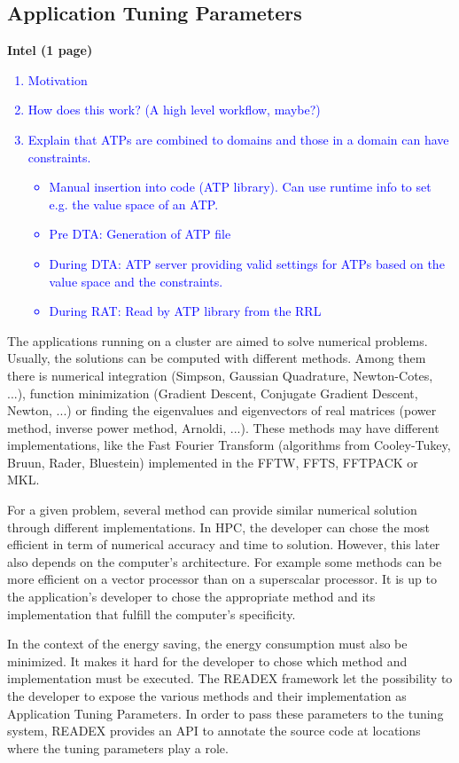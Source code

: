 \subsection{Application Tuning Parameters} \label{sec:atp}
\textbf{Intel (1 page)}
\textcolor{blue}{\begin{enumerate}
	\item Motivation
	\item How does this work? (A high level workflow, maybe?)
	\item Explain that ATPs are combined to domains and those in a domain can have constraints. 
	\begin{itemize}
		\item Manual insertion into code (ATP library). Can use runtime info to set e.g. the value space of an ATP.
		\item Pre DTA: Generation of ATP file
		\item During DTA: ATP server providing valid settings for ATPs based on the value space and the constraints.
		\item During RAT: Read by ATP library from the RRL
	\end{itemize}
\end{enumerate}}

The applications running on a cluster are aimed to solve numerical problems. Usually, the solutions can be computed with different methods. Among them there is numerical integration (Simpson, Gaussian Quadrature, Newton-Cotes, ...), function minimization (Gradient Descent, Conjugate Gradient Descent, Newton, ...) or finding the eigenvalues and eigenvectors of real matrices (power method, inverse power method, Arnoldi, ...). These methods may have different implementations, like the Fast Fourier Transform (algorithms from Cooley-Tukey, Bruun, Rader, Bluestein) implemented in the FFTW, FFTS, FFTPACK or MKL.

For a given problem, several method can provide similar numerical solution through different implementations. In HPC, the developer can chose the most efficient in term of numerical accuracy and time to solution. However, this later also depends on the computer's architecture. For example some methods can be more efficient on a vector processor than on a superscalar processor. It is up to the application's developer to chose the appropriate method and its implementation that fulfill the computer's specificity.

In the context of the energy saving, the energy consumption must also be minimized. It makes it hard for the developer to chose which method and implementation must be executed. The READEX framework let the possibility to the developer to expose the various methods and their implementation as Application Tuning Parameters. In order to pass these parameters to the tuning system, READEX provides an API to annotate the source code at locations where the tuning parameters play a role.

